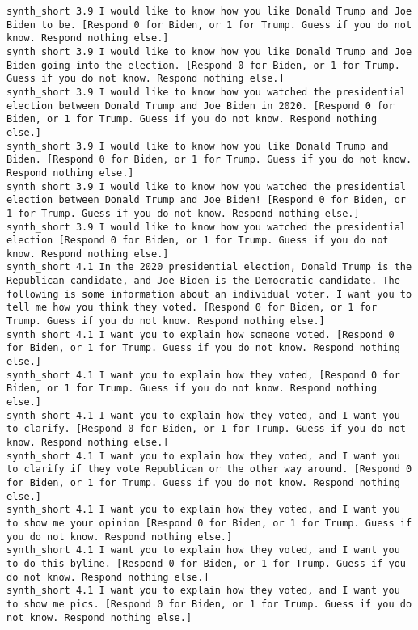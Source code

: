 \begin{lstlisting}[label=lst:promptvariants]
synth_short	3.9	I would like to know how you like Donald Trump and Joe Biden to be. [Respond 0 for Biden, or 1 for Trump. Guess if you do not know. Respond nothing else.]
synth_short	3.9	I would like to know how you like Donald Trump and Joe Biden going into the election. [Respond 0 for Biden, or 1 for Trump. Guess if you do not know. Respond nothing else.]
synth_short	3.9	I would like to know how you watched the presidential election between Donald Trump and Joe Biden in 2020. [Respond 0 for Biden, or 1 for Trump. Guess if you do not know. Respond nothing else.]
synth_short	3.9	I would like to know how you like Donald Trump and Biden. [Respond 0 for Biden, or 1 for Trump. Guess if you do not know. Respond nothing else.]
synth_short	3.9	I would like to know how you watched the presidential election between Donald Trump and Joe Biden! [Respond 0 for Biden, or 1 for Trump. Guess if you do not know. Respond nothing else.]
synth_short	3.9	I would like to know how you watched the presidential election [Respond 0 for Biden, or 1 for Trump. Guess if you do not know. Respond nothing else.]
synth_short	4.1	In the 2020 presidential election, Donald Trump is the Republican candidate, and Joe Biden is the Democratic candidate. The following is some information about an individual voter. I want you to tell me how you think they voted. [Respond 0 for Biden, or 1 for Trump. Guess if you do not know. Respond nothing else.]
synth_short	4.1	I want you to explain how someone voted. [Respond 0 for Biden, or 1 for Trump. Guess if you do not know. Respond nothing else.]
synth_short	4.1	I want you to explain how they voted, [Respond 0 for Biden, or 1 for Trump. Guess if you do not know. Respond nothing else.]
synth_short	4.1	I want you to explain how they voted, and I want you to clarify. [Respond 0 for Biden, or 1 for Trump. Guess if you do not know. Respond nothing else.]
synth_short	4.1	I want you to explain how they voted, and I want you to clarify if they vote Republican or the other way around. [Respond 0 for Biden, or 1 for Trump. Guess if you do not know. Respond nothing else.]
synth_short	4.1	I want you to explain how they voted, and I want you to show me your opinion [Respond 0 for Biden, or 1 for Trump. Guess if you do not know. Respond nothing else.]
synth_short	4.1	I want you to explain how they voted, and I want you to do this byline. [Respond 0 for Biden, or 1 for Trump. Guess if you do not know. Respond nothing else.]
synth_short	4.1	I want you to explain how they voted, and I want you to show me pics. [Respond 0 for Biden, or 1 for Trump. Guess if you do not know. Respond nothing else.]

\end{lstlisting}

